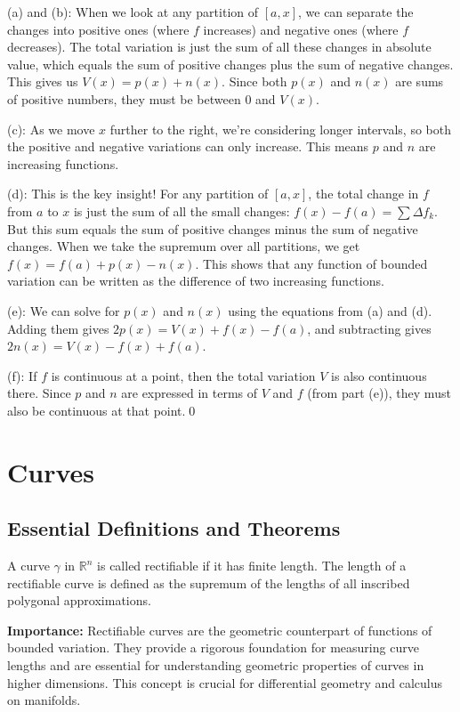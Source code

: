 (a) and (b): When we look at any partition of $[a,x]$, we can separate the changes into positive ones (where $f$ increases) and negative ones (where $f$ decreases). The total variation is just the sum of all these changes in absolute value, which equals the sum of positive changes plus the sum of negative changes. This gives us $V(x) = p(x) + n(x)$. Since both $p(x)$ and $n(x)$ are sums of positive numbers, they must be between $0$ and $V(x)$.

(c): As we move $x$ further to the right, we're considering longer intervals, so both the positive and negative variations can only increase. This means $p$ and $n$ are increasing functions.

(d): This is the key insight! For any partition of $[a,x]$, the total change in $f$ from $a$ to $x$ is just the sum of all the small changes: $f(x) - f(a) = \sum \Delta f_k$. But this sum equals the sum of positive changes minus the sum of negative changes. When we take the supremum over all partitions, we get $f(x) = f(a) + p(x) - n(x)$. This shows that any function of bounded variation can be written as the difference of two increasing functions.

(e): We can solve for $p(x)$ and $n(x)$ using the equations from (a) and (d). Adding them gives $2p(x) = V(x) + f(x) - f(a)$, and subtracting gives $2n(x) = V(x) - f(x) + f(a)$.

(f): If $f$ is continuous at a point, then the total variation $V$ is also continuous there. Since $p$ and $n$ are expressed in terms of $V$ and $f$ (from part (e)), they must also be continuous at that point.\qed
\section{Curves}

\subsection*{Essential Definitions and Theorems}

\begin{definition}
A curve $\gamma$ in $\mathbb{R}^n$ is called rectifiable if it has finite length. The length of a rectifiable curve is defined as the supremum of the lengths of all inscribed polygonal approximations.
\end{definition}

\noindent\textbf{Importance:} Rectifiable curves are the geometric counterpart of functions of bounded variation. They provide a rigorous foundation for measuring curve lengths and are essential for understanding geometric properties of curves in higher dimensions. This concept is crucial for differential geometry and calculus on manifolds.



